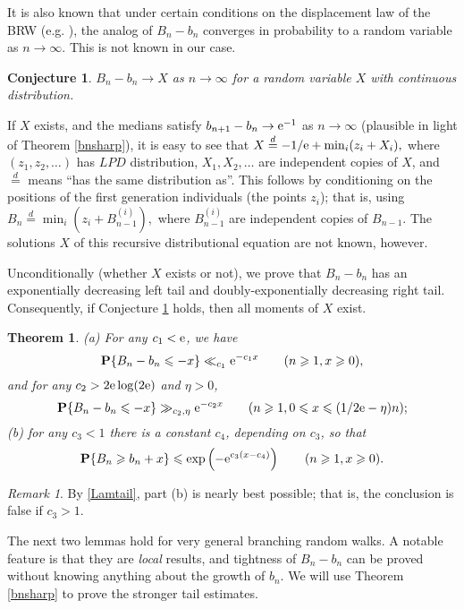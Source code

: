 \documentclass[12pt]{amsart}
\theoremstyle{remark}
\newtheorem{remark}{Remark}
\theoremstyle{plain}
\newtheorem{conj}{Conjecture}
\newtheorem{thm}{Theorem}
\numberwithin{equation}{section}
\newcommand{\PPP}{\mathbf P}
\renewcommand{\(}{\left(}
\renewcommand{\)}{\right)}
\newcommand{\deq}{\overset{d}=}  %
\newcommand{\er}{{\rm e}}  %
\renewcommand{\le}{\leqslant}
\renewcommand{\ge}{\geqslant}
\begin{document}
It is also known that under certain conditions on the
displacement law of the BRW (e.g. \cite{Ba}), the analog of $B_n-b_n$
converges in probability to a random variable as $n\to \infty$.
This is not known in our case.

\begin{conj}\label{conjX}
  $B_n-b_n \to X$ as $n\to\infty$ for a random variable $X$ with
  continuous distribution. 
\end{conj}

If $X$ exists, and the medians satisfy $b_{n+1}-b_n \to \er^{-1}$ as $n\to\infty$
(plausible in light of Theorem \eqref{bnsharp}), it
is easy to see that $X \deq -1/\er + \min_i ( z_i + X_i ),$
where $(z_1,z_2,\ldots)$ has $LPD$ distribution, $X_1, X_2, \ldots$
are independent copies of $X$, and $\deq$ means ``has the same distribution as''.  This follows by conditioning
on the positions of the first generation individuals (the points
$z_i$); that is, using
$B_n \deq \min_i ( z_i + B_{n-1}^{(i)} ),$
where $B_{n-1}^{(i)}$ are independent copies of $B_{n-1}$.  The solutions
$X$ of this recursive distributional equation are not known, however.

Unconditionally (whether $X$ exists or not), we prove that
$B_n-b_n$ has an exponentially decreasing left tail and doubly-exponentially 
decreasing right tail.
Consequently, if Conjecture \ref{conjX} holds, then all moments of $X$ exist.


\begin{thm}\label{tails}
(a) For any $c_1<\er$, we have
$$
\PPP\{B_n-b_n\le -x\} \ll_{c_1} \er^{-c_1 x} \qquad (n\ge 1, x\ge 0),
$$
and for any $c_2 > 2\er \log(2\er)$ and $\eta>0$, 
$$
\PPP\{B_n-b_n\le -x\} \gg_{c_2,\eta} \er^{-c_2 x} \qquad (n\ge 1, 0\le x\le (1/2\er-\eta)n);
$$
(b) for any $c_3<1$ there is a constant $c_4$, 
depending on $c_3$, so that
$$
\PPP \{ B_n \ge b_n + x \} \le \exp \( - \er^{c_3 (x-c_4)} \) \qquad
(n\ge 1, x\ge 0).
$$
\end{thm}

\begin{remark}
 By \eqref{Lamtail}, part (b) is nearly 
best possible; that is, the conclusion is false if $c_3>1$.
\end{remark}


The next two lemmas
hold for very general branching random walks.  A
notable feature is that they are \emph{local} results, and tightness
of $B_n-b_n$ can be proved without knowing anything about the growth
of $b_n$. We will use Theorem \ref{bnsharp} to 
prove the stronger tail estimates.
\end{document}
